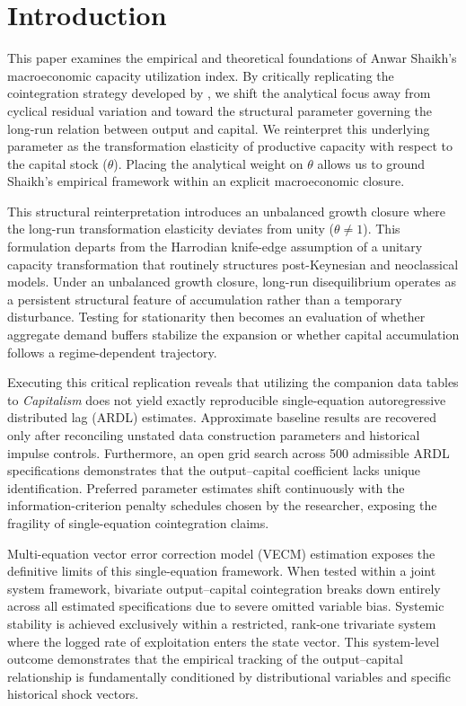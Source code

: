 \documentclass[11pt]{article}
\begin{document}
\section{Introduction}
\label{sec:introduction}

This paper examines the empirical and theoretical foundations of Anwar Shaikh's macroeconomic capacity utilization index. By critically replicating the cointegration strategy developed by \citet{Shaikh2016}, we shift the analytical focus away from cyclical residual variation and toward the structural parameter governing the long-run relation between output and capital. We reinterpret this underlying parameter as the transformation elasticity of productive capacity with respect to the capital stock ($\theta$). Placing the analytical weight on $\theta$ allows us to ground Shaikh's empirical framework within an explicit macroeconomic closure.

This structural reinterpretation introduces an unbalanced growth closure where the long-run transformation elasticity deviates from unity ($\theta \neq 1$). This formulation departs from the Harrodian knife-edge assumption of a unitary capacity transformation that routinely structures post-Keynesian and neoclassical models. Under an unbalanced growth closure, long-run disequilibrium operates as a persistent structural feature of accumulation rather than a temporary disturbance. Testing for stationarity then becomes an evaluation of whether aggregate demand buffers stabilize the expansion or whether capital accumulation follows a regime-dependent trajectory.

Executing this critical replication reveals that utilizing the companion data tables to \textit{Capitalism} does not yield exactly reproducible single-equation autoregressive distributed lag (ARDL) estimates. Approximate baseline results are recovered only after reconciling unstated data construction parameters and historical impulse controls. Furthermore, an open grid search across 500 admissible ARDL specifications demonstrates that the output--capital coefficient lacks unique identification. Preferred parameter estimates shift continuously with the information-criterion penalty schedules chosen by the researcher, exposing the fragility of single-equation cointegration claims.

Multi-equation vector error correction model (VECM) estimation exposes the definitive limits of this single-equation framework. When tested within a joint system framework, bivariate output--capital cointegration breaks down entirely across all estimated specifications due to severe omitted variable bias. Systemic stability is achieved exclusively within a restricted, rank-one trivariate system where the logged rate of exploitation enters the state vector. This system-level outcome demonstrates that the empirical tracking of the output--capital relationship is fundamentally conditioned by distributional variables and specific historical shock vectors.
\end{document}
